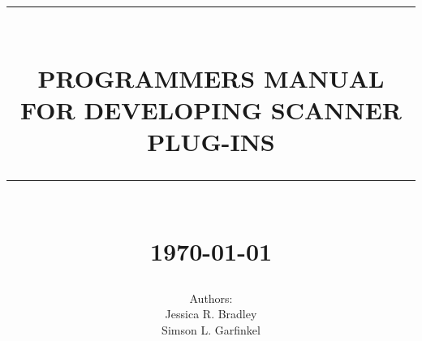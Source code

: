 \begin{titlepage}

%



\newcommand{\TRule}[1]{\rule{\linewidth}{#1}} 	%

\makeatletter							%
\def\printtitle{%
    {\centering \@title\par}}
\makeatother									

\makeatletter							%
\def\printauthor{%
    {\centering \large \@author}}				
\makeatother							

\title{	\LARGE \textsc{\mytitle} 	%
 \\[1.0cm]													%
 \TRule{0.5pt} \\										%
 \LARGE \textbf{\uppercase{Programmers Manual for Developing Scanner Plug-ins}}	%
 \TRule{2pt} \\ [0.5cm]								%
 \normalsize \today									%
}

\author{
		Authors: \\
		Jessica R. Bradley\\
		Simson L. Garfinkel\\		
}

\thispagestyle{empty}				%

\printtitle									%
  	\vfill
\printauthor								%














\end{titlepage}
